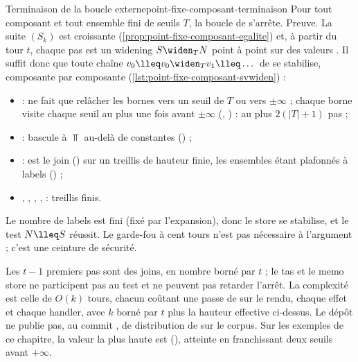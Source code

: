 \begin{theoreme}{Terminaison de la boucle externe}{point-fixe-composant-terminaison}
Pour tout composant et tout ensemble fini de seuils $T$, la boucle de
 s'arrête. Preuve. La suite $(S_k)$ est
croissante (\cref{prop:point-fixe-composant-egalite}) et, à partir du tour
$t$, chaque pas est un widening $S \widen_T N$ point à point sur des valeurs
. Il suffit donc que toute chaîne
$v_0 \lleq v_0 \widen_T v_1 \lleq \dots$ de  se stabilise,
composante par composante (\cref{lst:point-fixe-composant-svwiden}) :
\begin{itemize}
  \item {} :  ne fait que relâcher les
    bornes vers un seuil de $T$ ou vers $\pm\infty$ ; chaque borne visite
    chaque seuil au plus une fois avant $\pm\infty$
    (, ) : au plus
    $2(|T| + 1)$ pas ;
  \item {} :  bascule à $\Top$ au-delà de
     constantes
    () ;
  \item {} :  est le join
    () sur un treillis de
    hauteur finie, les ensembles  étant plafonnés à
     labels
    () ;
  \item {}, , , ,
     : treillis finis.
\end{itemize}
Le nombre de labels est fini (fixé par l'expansion), donc le store se
stabilise, et le test $N \lleq S$ réussit. Le garde-fou à cent tours n'est
pas nécessaire à l'argument ; c'est une ceinture de sécurité.
\end{theoreme}

Les $t - 1$ premiers pas sont des joins, en nombre borné par $t$ ; le tas et
le memo store ne participent pas au test et ne peuvent pas retarder l'arrêt.
La complexité est celle de $O(k)$ tours, chacun coûtant une passe de
 sur le rendu, chaque effet et chaque handler, avec $k$
borné par $t$ plus la hauteur effective ci-dessus. Le dépôt ne publie pas,
au commit \snapshotCommit, de distribution de  sur le
corpus. Sur les exemples de ce chapitre, la valeur la plus haute est
 (), atteinte en franchissant deux seuils
avant $+\infty$.

